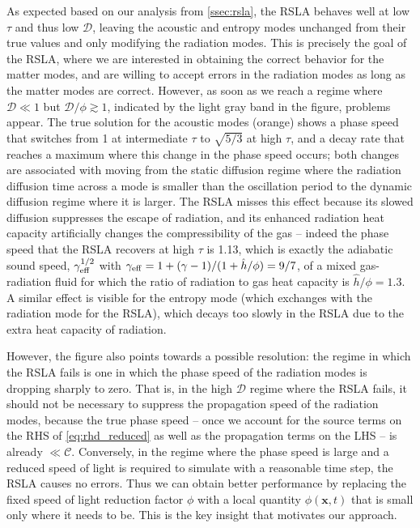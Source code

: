 \documentclass[preprint,12pt,authoryear]{elsarticle}
\newcommand{\vecx}{\mathbf{x}}
\newcommand{\calC}{\mathcal{C}}
\newcommand{\calD}{\mathcal{D}}
\begin{document}
As expected based on our analysis from \autoref{ssec:rsla}, the RSLA behaves well at low $\tau$ and thus low $\calD$, leaving the acoustic and entropy modes unchanged from their true values and only modifying the radiation modes. This is precisely the goal of the RSLA, where we are interested in obtaining the correct behavior for the matter modes, and are willing to accept errors in the radiation modes as long as the matter modes are correct. However, as soon as we reach a regime where $\calD \ll 1$ but $\calD/\phi \gtrsim 1$, indicated by the light gray band in the figure, problems appear. The true solution for the acoustic modes (orange) shows a phase speed that switches from 1 at intermediate $\tau$ to $\sqrt{5/3}$ at high $\tau$, and a decay rate that reaches a maximum where this change in the phase speed occurs; both changes are associated with moving from the static diffusion regime where the radiation diffusion time across a mode is smaller than the oscillation period to the dynamic diffusion regime where it is larger. The RSLA misses this effect because its slowed diffusion suppresses the escape of radiation, and its enhanced radiation heat capacity artificially changes the compressibility of the gas -- indeed the phase speed that the RSLA recovers at high $\tau$ is 1.13, which is exactly the adiabatic sound speed, $\gamma_{\rm eff}^{1/2}$ with $\gamma_{\rm eff} = 1 + (\gamma - 1)/(1 + \hat{h}/\phi) = 9/7$, of a mixed gas-radiation fluid for which the ratio of radiation to gas heat capacity is $\hat{h}/\phi = 1.3$. A similar effect is visible for the entropy mode (which exchanges with the radiation mode for the RSLA), which decays too slowly in the RSLA due to the extra heat capacity of radiation.

However, the figure also points towards a possible resolution: the regime in which the RSLA fails is one in which the phase speed of the radiation modes is dropping sharply to zero. That is, in the high $\calD$ regime where the RSLA fails, it should not be necessary to suppress the propagation speed of the radiation modes, because the true phase speed -- once we account for the source terms on the RHS of \autoref{eq:rhd_reduced} as well as the propagation terms on the LHS -- is already $\ll \calC$. Conversely, in the regime where the phase speed is large and a reduced speed of light is required to simulate with a reasonable time step, the RSLA causes no errors. Thus we can obtain better performance by replacing the fixed speed of light reduction factor $\phi$ with a local quantity $\phi(\vecx,t)$ that is small only where it needs to be. This is the key insight that motivates our approach.
\end{document}
